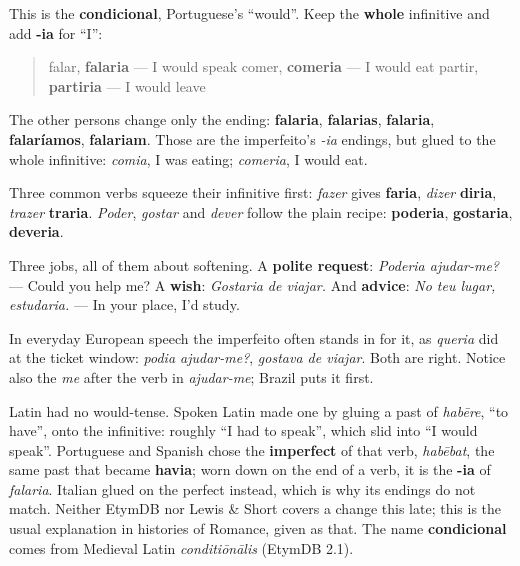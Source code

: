 \begin{grammarlens}[title={Grammar Lens: the whole infinitive, plus -ia}]
This is the \textbf{condicional}, Portuguese's \textquotedblleft{}would\textquotedblright{}. Keep the \textbf{whole} infinitive and add \textbf{-ia} for \textquotedblleft{}I\textquotedblright{}:

\begin{quote}
falar, \textbf{falaria} — I would speak comer, \textbf{comeria} — I would eat partir, \textbf{partiria} — I would leave
\end{quote}

The other persons change only the ending: \textbf{falaria}, \textbf{falarias}, \textbf{falaria}, \textbf{falaríamos}, \textbf{falariam}. Those are the imperfeito's \emph{-ia} endings, but glued to the whole infinitive: \emph{comia}, I was eating; \emph{comeria}, I would eat.

Three common verbs squeeze their infinitive first: \emph{fazer} gives \textbf{faria}, \emph{dizer} \textbf{diria}, \emph{trazer} \textbf{traria}. \emph{Poder}, \emph{gostar} and \emph{dever} follow the plain recipe: \textbf{poderia}, \textbf{gostaria}, \textbf{deveria}.

Three jobs, all of them about softening. A \textbf{polite request}: \emph{Poderia ajudar-me?} — Could you help me? A \textbf{wish}: \emph{Gostaria de viajar.} And \textbf{advice}: \emph{No teu lugar, estudaria.} — In your place, I'd study.

In everyday European speech the imperfeito often stands in for it, as \emph{queria} did at the ticket window: \emph{podia ajudar-me?}, \emph{gostava de viajar}. Both are right. Notice also the \emph{me} after the verb in \emph{ajudar-me}; Brazil puts it first.
\end{grammarlens}

\begin{cousinweb}
Latin had no would-tense. Spoken Latin made one by gluing a past of \emph{habēre}, \textquotedblleft{}to have\textquotedblright{}, onto the infinitive: roughly \textquotedblleft{}I had to speak\textquotedblright{}, which slid into \textquotedblleft{}I would speak\textquotedblright{}. Portuguese and Spanish chose the \textbf{imperfect} of that verb, \emph{habēbat}, the same past that became \textbf{havia}; worn down on the end of a verb, it is the \textbf{-ia} of \emph{falaria}. Italian glued on the perfect instead, which is why its endings do not match. Neither EtymDB nor Lewis \& Short covers a change this late; this is the usual explanation in histories of Romance, given as that. The name \textbf{condicional} comes from Medieval Latin \emph{conditiōnālis} (EtymDB 2.1).
\end{cousinweb}

